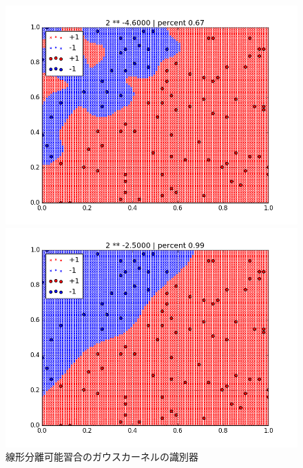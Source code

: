 \documentclass[]{jsarticle}
\begin{document}
\begin{figure}[htbp]
 \begin{minipage}[b]{0.5\hsize}
  \includegraphics[scale=0.4]{./cross_validate_images/gauss_linears/1.png}
 \end{minipage}
 \begin{minipage}[b]{0.5\hsize}
  \includegraphics[scale=0.4]{./cross_validate_images/gauss_linears/2.png}
 \end{minipage}
 \caption{線形分離可能習合のガウスカーネルの識別器}
\end{figure}
\end{document}
